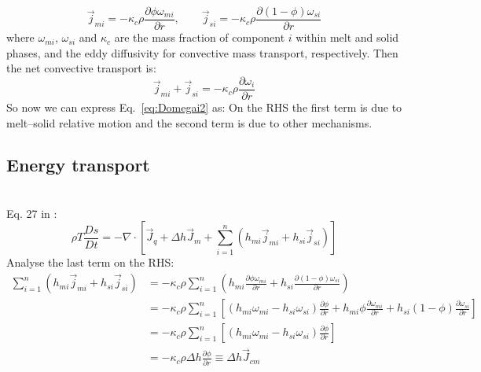 \begin{equation}
\vec{j}_{mi} = -\kappa_c \rho \frac{\partial \phi \omega_{mi}}{\partial r}, \qquad \vec{j}_{si} = -\kappa_c \rho \frac{\partial (1-\phi) \omega_{si}}{\partial r}
\end{equation}
where $\omega_{mi}$, $\omega_{si}$ and $\kappa_c$ are the mass fraction of component $i$ within melt and solid phases, and the eddy diffusivity for convective mass transport, respectively.  Then the net convective transport is:
\begin{equation}
\vec{j}_{mi} + \vec{j}_{si} = -\kappa_c \rho \frac{\partial \omega_i}{\partial r}
\end{equation}
So now we can express Eq.~\ref{eq:Domegai2} as:
On the RHS the first term is due to melt--solid relative motion and the second term is due to other mechanisms.

\subsection{Energy transport}
\\

\noindent
Eq. 27 in \cite{ABE95}:
\begin{equation}
\rho T \frac{Ds}{Dt} = -\nabla \cdot \left[ \vec{J}_q + \Delta h \vec{J}_m + \sum_{i=1}^n (h_{mi} \vec{j}_{mi} + h_{si}\vec{j}_{si}) \right]
\end{equation}
Analyse the last term on the RHS:
\begin{align}
\sum_{i=1}^n (h_{mi} \vec{j}_{mi} + h_{si}\vec{j}_{si}) &= -\kappa_c \rho \sum_{i=1}^n \left(h_{mi} \frac{\partial \phi \omega_{mi}}{\partial r} + h_{si} \frac{\partial (1-\phi) \omega_{si}}{\partial r} \right)\\
&= -\kappa_c \rho \sum_{i=1}^n \left[ (h_{mi} \omega_{mi} - h_{si} \omega_{si})\frac{\partial \phi}{\partial r} + h_{mi} \phi \frac{\partial \omega_{mi}}{\partial r} + h_{si} (1-\phi) \frac{\partial \omega_{si}}{\partial r} \right]\\
&= -\kappa_c \rho \sum_{i=1}^n \left[ (h_{mi} \omega_{mi} - h_{si} \omega_{si})\frac{\partial \phi}{\partial r} \right]\\
&= -\kappa_c \rho \Delta h \frac{\partial \phi}{\partial r} \equiv \Delta h \vec{J}_{cm}
\end{align}

